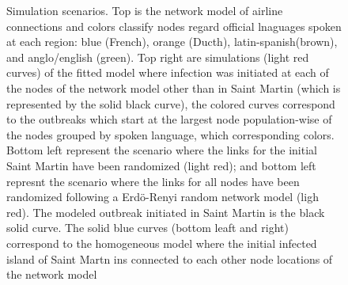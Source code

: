 \documentclass[11pt]{article}
\begin{document}
\begin{figure}[ht]
\caption{\small Simulation scenarios. Top is the network model of airline connections and colors classify nodes regard official lnaguages spoken at each region: blue (French), orange (Ducth), latin-spanish(brown), and anglo/english (green). Top right are simulations (light red curves) of the fitted model where infection was initiated at each of the nodes of the network model other than in Saint Martin (which is represented by the solid black curve), the colored curves correspond to the outbreaks which start at the largest node population-wise of the nodes grouped by spoken language, which corresponding colors. Bottom left represent the scenario where the links for the initial Saint Martin have been randomized (light red); and bottom left represnt the scenario where the links for all nodes have been randomized following a Erd\"{o}-Renyi random network model (ligh red). The modeled outbreak initiated in Saint Martin is the black solid curve. The solid blue curves (bottom leaft and right) correspond to the homogeneous model where the initial infected island of Saint Martn ins connected to each other node locations of the network model}
\label{fig:scenarios}
\end{figure}
%
\vspace{2cm}
%
\end{document}
